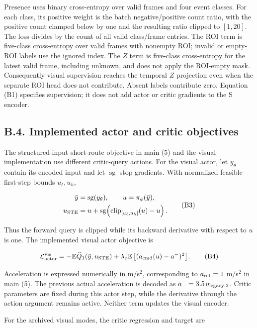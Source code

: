 \documentclass[letterpaper,journal,onecolumn]{IEEEtran}
\begin{document}
Presence uses binary cross-entropy over valid frames and four event classes. For each class, its positive weight is the batch negative/positive count ratio, with the positive count clamped below by one and the resulting ratio clipped to \([1,20]\). The loss divides by the count of all valid class/frame entries. The ROI term is five-class cross-entropy over valid frames with nonempty ROI; invalid or empty-ROI labels use the ignored index. The \(Z\) term is five-class cross-entropy for the latest valid frame, including unknown, and does not apply the ROI-empty mask. Consequently visual supervision reaches the temporal \(Z\) projection even when the separate ROI head does not contribute. Absent labels contribute zero. Equation (B1) specifies supervision; it does not add actor or critic gradients to the S encoder.

\subsection*{B.4. Implemented actor and critic objectives}

The structured-input short-route objective in main (5) and the visual implementation use different critic-query actions. For the visual actor, let \(y_\theta\) contain its encoded input and let \(\operatorname{sg}\) stop gradients. With normalized feasible first-step bounds \(u_\ell,u_h\),

\[\begin{aligned}
\bar y&=\operatorname{sg}(y_\theta),\qquad u=\pi_\phi(\bar y),\\
u_{\rm STE}&=u+\operatorname{sg}\!\left(\operatorname{clip}_{[u_\ell,u_h]}(u)-u\right).
\end{aligned}\tag{B3}\]

Thus the forward query is clipped while its backward derivative with respect to \(u\) is one. The implemented visual actor objective is

\[\mathcal L_{\rm actor}^{\rm vis}=-\mathbb E\widehat Q_1(\bar y,u_{\rm STE})+\lambda_c\mathbb E\left[(a_{\rm cmd}(u)-a^-)^2\right].\tag{B4}\]

Acceleration is expressed numerically in m/s\(^2\), corresponding to \(a_{\rm ref}=1\) m/s\(^2\) in main (5). The previous actual acceleration is decoded as \(a^-=3.5\,o_{\rm legacy,2}\). Critic parameters are fixed during this actor step, while the derivative through the action argument remains active. Neither term updates the visual encoder.

For the archived visual modes, the critic regression and target are
\end{document}
